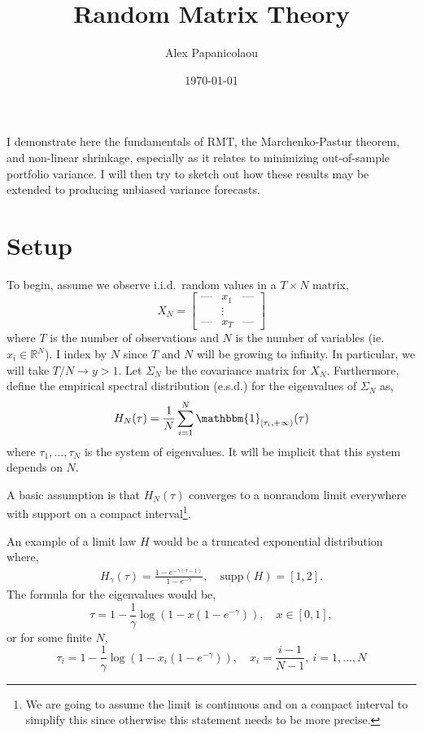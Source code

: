 \documentclass{article}
\begin{document}
\title{Random Matrix Theory}
\author{Alex Papanicolaou}
\date{\today}
\maketitle

\newcommand{\Tr}{\mathrm{Tr}}

I demonstrate here the fundamentals of RMT, the Marchenko-Pastur theorem, and
non-linear shrinkage, especially as it relates to minimizing out-of-sample
portfolio variance.  I will then try to sketch out how these results may be
extended to producing unbiased variance forecasts.

\section{Setup}

To begin, assume we observe i.i.d.\ random values in a $T \times N$ matrix,
$$
	X_N = \begin{bmatrix} 
					\text{---} & x_1    & \text{---} \\
					           & \vdots &            \\
					\text{---} & x_T    & \text{---}
				\end{bmatrix}
$$
where $T$ is the number of observations and $N$ is the number of variables (ie.
$x_i \in \mathbb{R}^N$).  I index by $N$ since $T$ and $N$ will be growing to
infinity.  In particular, we will take $T / N \rightarrow y > 1$.  Let
$\Sigma_N$ be the covariance matrix for $X_N$.  Furthermore, define the
empirical spectral distribution (e.s.d.) for the eigenvalues of $\Sigma_N$ as,
$$
	H_N(\tau) = \frac{1}{N}\sum_{i=1}^N \mathbbm{1}_{[\tau_{i}, +\infty)}(\tau)
$$
where $\tau_{1}, \ldots, \tau_N$ is the system of eigenvalues.  It will be
implicit that this system depends on $N$. 

A basic assumption is that $H_N(\tau)$ converges to a nonrandom limit everywhere
with support on a compact interval\footnote{We are going to assume the limit is
continuous and on a compact interval to simplify this since otherwise this
statement needs to be more precise.}.

An example of a limit law $H$ would be a truncated exponential distribution
where,
\begin{gather*}
	H_\gamma(\tau) = \frac{1 - e^{-\gamma(\tau - 1)}}{1 - e^{-\gamma}}, 
		\quad \mathrm{supp}(H) = [1, 2].
\end{gather*}
The formula for the eigenvalues would be,
$$
	\tau = 1 - \frac1\gamma \log\left( 1 - x(1-e^{-\gamma}) \right),
	\quad x \in [0, 1],
$$
or for some finite $N$,
$$
	\tau_i = 1 - \frac1\gamma \log\left( 1 - x_i(1-e^{-\gamma}) \right),
	\quad x_i = \frac{i - 1}{N - 1},\ i = 1, \ldots, N
$$
\end{document}
